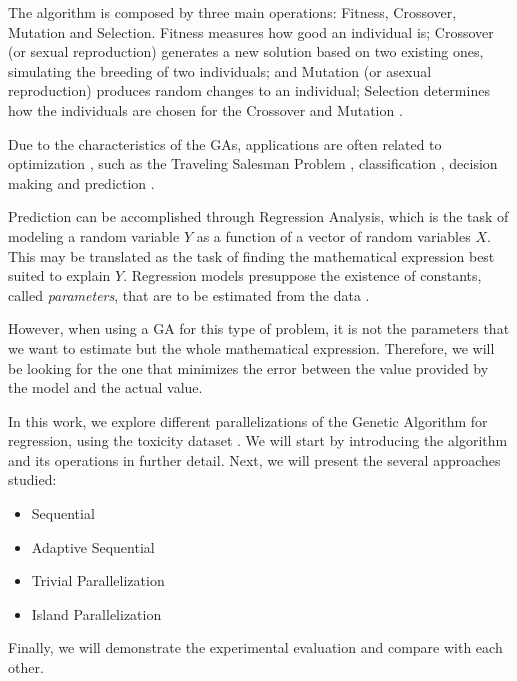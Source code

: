 \documentclass[runningheads]{llncs}
\begin{document}
The algorithm is composed by three main operations: Fitness, Crossover, Mutation and Selection. Fitness measures how good an individual is; Crossover (or sexual reproduction) generates a new solution based on two existing ones, simulating the breeding of two individuals; and Mutation (or asexual reproduction) produces random changes to an individual; Selection determines how the individuals are chosen for the Crossover and Mutation \cite{langdon1995genetic}.

Due to the characteristics of the GAs, applications are often related to optimization \cite{sivanandam2008genetic}, such as the Traveling Salesman Problem \cite{grefenstette1985genetic}, classification \cite{5340522}, decision making \cite{George:2012:GAB:2345396.2345426} and prediction \cite{etemadi2009genetic}.

Prediction can be accomplished through Regression Analysis, which is the task of modeling a random variable $Y$ as a function of a vector of random variables $X$. This may be translated as the task of finding the mathematical expression best suited to explain $Y$. Regression models presuppose the existence of constants, called \textit{parameters}, that are to be estimated from the data \cite{rawlings2001applied}.

However, when using a GA for this type of problem, it is not the parameters that we want to estimate but the whole mathematical expression. Therefore, we will be looking for the one that minimizes the error between the value provided by the model and the actual value.

In this work, we explore different parallelizations of the Genetic Algorithm for regression, using the toxicity dataset \cite{krawiec2013genetic}. We will start by introducing the algorithm and its operations in further detail. Next, we will present the several approaches studied:

\begin{itemize}
\item Sequential
\item Adaptive Sequential
\item Trivial Parallelization
\item Island Parallelization
\end{itemize}

Finally, we will demonstrate the experimental evaluation and compare with each other.

\end{document}
